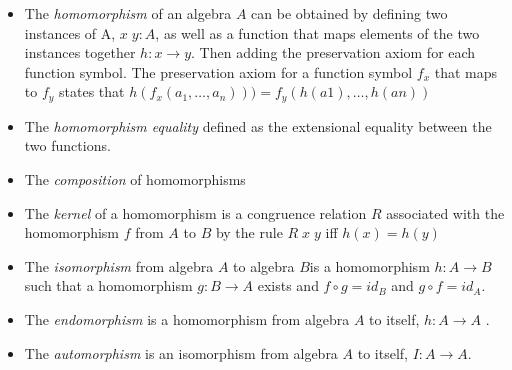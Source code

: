 \begin{itemize}
    	\item The \textit{homomorphism} of an algebra $A$ can be obtained by defining two 
    	instances of A,  
    	$x \; y : A$, as well as a function that maps elements of the two instances together $h : x 
    	\rightarrow y$. Then adding the preservation axiom for each function symbol. The 
    	preservation axiom for a function symbol $f_x$ that maps to $f_y$ states that 
    	$h(f_x(a_1, \ldots, a_n))) = f_y(h(a1), \ldots, h(an))$
    	\item The \textit{homomorphism equality} defined as the extensional equality between the two 
    	functions. 
    	\item The \textit{composition} of homomorphisms
    	\item The \textit{kernel} of a homomorphism is a congruence relation $R$ associated with 
    	the 
    	homomorphism $f$ from $A$ to $B$ by the rule $R \; x \; y$ iff  $h(x)=h(y)$
    	\item The \textit{isomorphism} from algebra $A$ to algebra $B$is a homomorphism $h : A 
    	\rightarrow B$ such that a homomorphism $g : B \rightarrow A$ exists and $f \circ g = id_B$ 
    	and $g \circ f = id_A$.
    	\item The \textit{endomorphism} is a homomorphism from algebra $A$ to itself, $h : A 
    	\rightarrow A$ . 
    	\item The \emph{automorphism} is an isomorphism from algebra $A$ to itself, $I : A 
    	\rightarrow A$. 
    	

\end{itemize}
